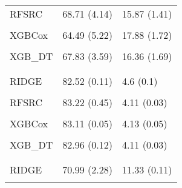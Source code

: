 \begin{longtable}[t]{lll}
\hspace{1em}RFSRC & 68.71 (4.14) & 15.87 (1.41)\\
\hspace{1em}\cellcolor{gray!10}{RFSRC\_DT} & \cellcolor{gray!10}{66.3 (4)} & \cellcolor{gray!10}{16.65 (1.77)}\\
\hspace{1em}XGBCox & 64.49 (5.22) & 17.88 (1.72)\\
\hspace{1em}\cellcolor{gray!10}{XGB\_PEM} & \cellcolor{gray!10}{68.3 (4.71)} & \cellcolor{gray!10}{16.11 (1.57)}\\
\hspace{1em}XGB\_DT & 67.83 (3.59) & 16.36 (1.69)\\
\addlinespace[0.3em]
\multicolumn{3}{l}{\textbf{nafld1}}\\
\hspace{1em}\cellcolor{gray!10}{KM} & \cellcolor{gray!10}{50 (0)} & \cellcolor{gray!10}{5.23 (0.08)}\\
\hspace{1em}RIDGE & 82.52 (0.11) & 4.6 (0.1)\\
\hspace{1em}\cellcolor{gray!10}{GLMN} & \cellcolor{gray!10}{82.58 (0.08)} & \cellcolor{gray!10}{4.59 (0.15)}\\
\hspace{1em}RFSRC & 83.22 (0.45) & 4.11 (0.03)\\
\hspace{1em}\cellcolor{gray!10}{RFSRC\_DT} & \cellcolor{gray!10}{NA} & \cellcolor{gray!10}{4.2 (0.09)}\\
\hspace{1em}XGBCox & 83.11 (0.05) & 4.13 (0.05)\\
\hspace{1em}\cellcolor{gray!10}{XGB\_PEM} & \cellcolor{gray!10}{82.95 (0.14)} & \cellcolor{gray!10}{4.14 (0.04)}\\
\hspace{1em}XGB\_DT & 82.96 (0.12) & 4.11 (0.03)\\
\addlinespace[0.3em]
\multicolumn{3}{l}{\textbf{nwtco}}\\
\hspace{1em}\cellcolor{gray!10}{KM} & \cellcolor{gray!10}{50 (0)} & \cellcolor{gray!10}{11.49 (0.08)}\\
\hspace{1em}RIDGE & 70.99 (2.28) & 11.33 (0.11)\\
\hspace{1em}\cellcolor{gray!10}{GLMN} & \cellcolor{gray!10}{59.39 (7.5)} & \cellcolor{gray!10}{11.35 (0.12)}\\

\end{longtable}
